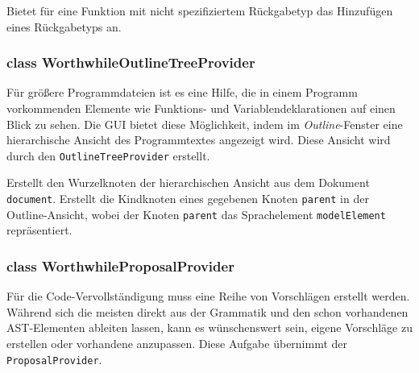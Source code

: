 \begin{description}
	 Bietet für eine Funktion mit nicht spezifiziertem Rückgabetyp das Hinzufügen eines Rückgabetyps an.
\end{description}

\subsubsection{class WorthwhileOutlineTreeProvider}

Für größere Programmdateien ist es eine Hilfe, die in einem Programm vorkommenden Elemente wie Funktions- und Variablendeklarationen auf einen Blick zu sehen. Die GUI bietet diese Möglichkeit, indem im \textit{Outline}-Fenster eine hierarchische Ansicht des Programmtextes angezeigt wird. Diese Ansicht wird durch den \texttt{OutlineTreeProvider} erstellt.

\begin{description}
	 Erstellt den Wurzelknoten der hierarchischen Ansicht aus dem Dokument \texttt{document}.
	 Erstellt die Kindknoten eines gegebenen Knoten \texttt{parent} in der Outline-Ansicht, wobei der Knoten \texttt{parent} das Sprachelement \texttt{modelElement} repräsentiert.
\end{description}

\subsubsection{class WorthwhileProposalProvider}

Für die Code-Vervollständigung muss eine Reihe von Vorschlägen erstellt werden. Während sich die meisten direkt aus der Grammatik und den schon vorhandenen AST-Elementen ableiten lassen, kann es wünschenswert sein, eigene Vorschläge zu erstellen oder vorhandene anzupassen. Diese Aufgabe übernimmt der \texttt{ProposalProvider}.

